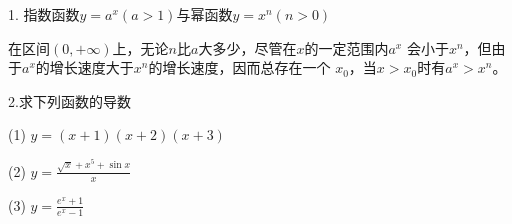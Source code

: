 \documentclass{ujarticle}
\begin{document}
1. 指数函数$y=a^x (a>1)$与幂函数$y=x^n (n>0)$

在区间$(0, +\infty)$上，无论$n$比$a$大多少，尽管在$x$的一定范围内$a^x$
会小于$x^n$，但由于$a^x$的增长速度大于$x^n$的增长速度，因而总存在一个
$x_0$，当$x>x_0$时有$a^x>x^n$。

2.求下列函数的导数

(1) $y=(x+1)(x+2)(x+3)$

(2) $y=\displaystyle\frac{\sqrt{x} +x^5+\sin x}{x}$

(3) $y=\displaystyle\frac{e^x+1}{e^x-1}$
\end{document}
